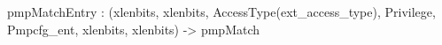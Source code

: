 pmpMatchEntry : (xlenbits, xlenbits, AccessType(ext_access_type), Privilege, Pmpcfg_ent, xlenbits, xlenbits) -> pmpMatch